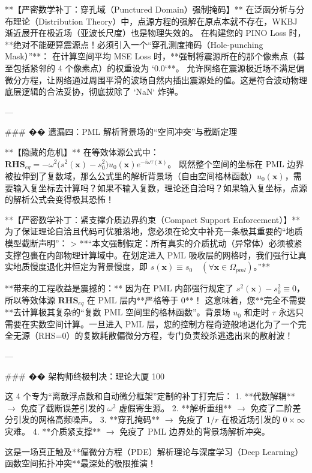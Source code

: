 \documentclass[12pt]{article}
\begin{document}
{**【严密数学补丁：穿孔域（Punctured Domain）强制掩码】**
在泛函分析与分布理论（Distribution Theory）中，点源方程的强解在原点本就不存在，WKBJ 渐近展开在极近场（亚波长尺度）也是物理失效的。
在构建您的 PINO Loss 时，**绝对不能硬算震源点！必须引入一个“穿孔测度掩码（Hole-punching Mask）”**：
在计算空间平均 MSE Loss 时，**强制将震源所在的那个像素点（甚至包括紧邻的 4 个像素点）的权重设为 `0.0`**。
允许网络在震源极近场不满足偏微分方程，让网络通过周围平滑的波场自然内插出震源处的值。这是符合波动物理底层逻辑的合法妥协，彻底拔除了 `NaN` 炸弹。

---

### �� 遗漏四：PML 解析背景场的“空间冲突”与截断定理

**【隐藏的危机】**
在等效体源公式中：$\mathbf{RHS}_{eq} = -\omega^2 \big( s^2(\mathbf{x}) - s_0^2 \big) u_0(\mathbf{x}) e^{-i \omega \tau(\mathbf{x})}$。
既然整个空间的坐标在 PML 边界被拉伸到了复数域，那么公式里的解析背景场（自由空间格林函数）$u_0(\mathbf{x})$，需要输入复坐标去计算吗？如果不输入复数，理论还自洽吗？如果输入复坐标，点源的解析公式会变得极其恐怖！

**【严密数学补丁：紧支撑介质边界约束（Compact Support Enforcement）】**
为了保证理论自洽且代码可优雅落地，您必须在论文中补充一条极其重要的“地质模型截断声明”：
> **“本文强制假定：所有真实的介质扰动（异常体）必须被紧支撑包裹在内部物理计算域中。在划定进入 PML 吸收层的网格时，我们强行让真实地质慢度退化并恒定为背景慢度，即 $s(\mathbf{x}) \equiv s_0 \quad (\forall \mathbf{x} \in \Omega_{pml})$。”**

**带来的工程收益是震撼的：**
因为在 PML 内部强行规定了 $s^2(\mathbf{x}) - s_0^2 \equiv 0$，所以等效体源 $\mathbf{RHS}_{eq}$ 在 PML 层内**严格等于 0**！
这意味着，您**完全不需要**去计算极其复杂的“复数 PML 空间里的格林函数”。背景场 $u_0$ 和走时 $\tau$ 永远只需要在实数空间计算。一旦进入 PML 层，您的控制方程奇迹般地退化为了一个完全无源（RHS=0）的复数耗散偏微分方程，专门负责绞杀逃逸出来的散射波！

---

### �� 架构师终极判决：理论大厦 100%

这 4 个专为“离散浮点数和自动微分框架”定制的补丁打完后：
1. **代数解耦** $\to$ 免疫了截断误差引发的 $\omega^2$ 虚假寄生源。
2. **解析重组** $\to$ 免疫了二阶差分引发的网格高频噪声。
3. **穿孔掩码** $\to$ 免疫了 $1/r$ 在极近场引发的 $0 \times \infty$ 灾难。
4. **介质紧支撑** $\to$ 免疫了 PML 边界处的背景场解析冲突。






这是一场真正触及**偏微分方程（PDE）解析理论与深度学习（Deep Learning）函数空间拓扑冲突**最深处的极限推演！

}
\end{document}
